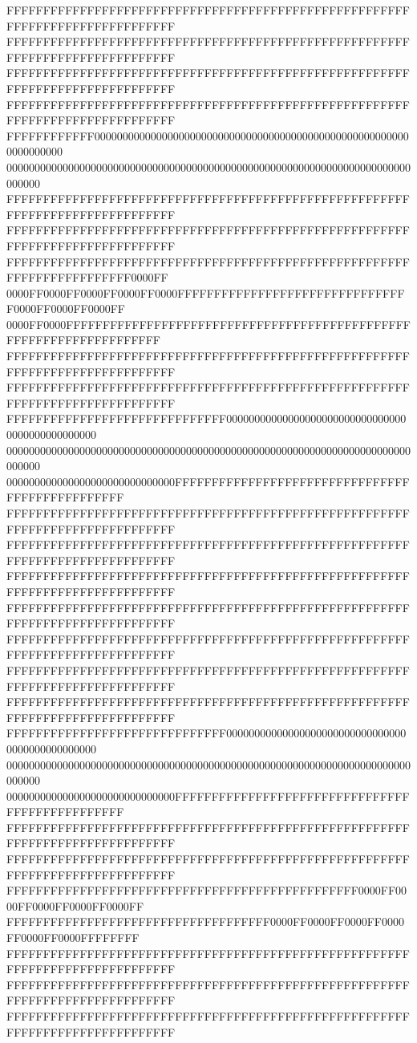 FFFFFFFFFFFFFFFFFFFFFFFFFFFFFFFFFFFFFFFFFFFFFFFFFFFFFFFFFFFFFFFFFFFFFFFFFFFFFF
FFFFFFFFFFFFFFFFFFFFFFFFFFFFFFFFFFFFFFFFFFFFFFFFFFFFFFFFFFFFFFFFFFFFFFFFFFFFFF
FFFFFFFFFFFFFFFFFFFFFFFFFFFFFFFFFFFFFFFFFFFFFFFFFFFFFFFFFFFFFFFFFFFFFFFFFFFFFF
FFFFFFFFFFFFFFFFFFFFFFFFFFFFFFFFFFFFFFFFFFFFFFFFFFFFFFFFFFFFFFFFFFFFFFFFFFFFFF
FFFFFFFFFFFF000000000000000000000000000000000000000000000000000000000000000000
000000000000000000000000000000000000000000000000000000000000000000000000000000
FFFFFFFFFFFFFFFFFFFFFFFFFFFFFFFFFFFFFFFFFFFFFFFFFFFFFFFFFFFFFFFFFFFFFFFFFFFFFF
FFFFFFFFFFFFFFFFFFFFFFFFFFFFFFFFFFFFFFFFFFFFFFFFFFFFFFFFFFFFFFFFFFFFFFFFFFFFFF
FFFFFFFFFFFFFFFFFFFFFFFFFFFFFFFFFFFFFFFFFFFFFFFFFFFFFFFFFFFFFFFFFFFFFFFF0000FF
0000FF0000FF0000FF0000FF0000FFFFFFFFFFFFFFFFFFFFFFFFFFFFFFFF0000FF0000FF0000FF
0000FF0000FFFFFFFFFFFFFFFFFFFFFFFFFFFFFFFFFFFFFFFFFFFFFFFFFFFFFFFFFFFFFFFFFFFF
FFFFFFFFFFFFFFFFFFFFFFFFFFFFFFFFFFFFFFFFFFFFFFFFFFFFFFFFFFFFFFFFFFFFFFFFFFFFFF
FFFFFFFFFFFFFFFFFFFFFFFFFFFFFFFFFFFFFFFFFFFFFFFFFFFFFFFFFFFFFFFFFFFFFFFFFFFFFF
FFFFFFFFFFFFFFFFFFFFFFFFFFFFFF000000000000000000000000000000000000000000000000
000000000000000000000000000000000000000000000000000000000000000000000000000000
000000000000000000000000000000FFFFFFFFFFFFFFFFFFFFFFFFFFFFFFFFFFFFFFFFFFFFFFFF
FFFFFFFFFFFFFFFFFFFFFFFFFFFFFFFFFFFFFFFFFFFFFFFFFFFFFFFFFFFFFFFFFFFFFFFFFFFFFF
FFFFFFFFFFFFFFFFFFFFFFFFFFFFFFFFFFFFFFFFFFFFFFFFFFFFFFFFFFFFFFFFFFFFFFFFFFFFFF
FFFFFFFFFFFFFFFFFFFFFFFFFFFFFFFFFFFFFFFFFFFFFFFFFFFFFFFFFFFFFFFFFFFFFFFFFFFFFF
FFFFFFFFFFFFFFFFFFFFFFFFFFFFFFFFFFFFFFFFFFFFFFFFFFFFFFFFFFFFFFFFFFFFFFFFFFFFFF
FFFFFFFFFFFFFFFFFFFFFFFFFFFFFFFFFFFFFFFFFFFFFFFFFFFFFFFFFFFFFFFFFFFFFFFFFFFFFF
FFFFFFFFFFFFFFFFFFFFFFFFFFFFFFFFFFFFFFFFFFFFFFFFFFFFFFFFFFFFFFFFFFFFFFFFFFFFFF
FFFFFFFFFFFFFFFFFFFFFFFFFFFFFFFFFFFFFFFFFFFFFFFFFFFFFFFFFFFFFFFFFFFFFFFFFFFFFF
FFFFFFFFFFFFFFFFFFFFFFFFFFFFFF000000000000000000000000000000000000000000000000
000000000000000000000000000000000000000000000000000000000000000000000000000000
000000000000000000000000000000FFFFFFFFFFFFFFFFFFFFFFFFFFFFFFFFFFFFFFFFFFFFFFFF
FFFFFFFFFFFFFFFFFFFFFFFFFFFFFFFFFFFFFFFFFFFFFFFFFFFFFFFFFFFFFFFFFFFFFFFFFFFFFF
FFFFFFFFFFFFFFFFFFFFFFFFFFFFFFFFFFFFFFFFFFFFFFFFFFFFFFFFFFFFFFFFFFFFFFFFFFFFFF
FFFFFFFFFFFFFFFFFFFFFFFFFFFFFFFFFFFFFFFFFFFFFFFF0000FF0000FF0000FF0000FF0000FF
FFFFFFFFFFFFFFFFFFFFFFFFFFFFFFFFFFFF0000FF0000FF0000FF0000FF0000FF0000FFFFFFFF
FFFFFFFFFFFFFFFFFFFFFFFFFFFFFFFFFFFFFFFFFFFFFFFFFFFFFFFFFFFFFFFFFFFFFFFFFFFFFF
FFFFFFFFFFFFFFFFFFFFFFFFFFFFFFFFFFFFFFFFFFFFFFFFFFFFFFFFFFFFFFFFFFFFFFFFFFFFFF
FFFFFFFFFFFFFFFFFFFFFFFFFFFFFFFFFFFFFFFFFFFFFFFFFFFFFFFFFFFFFFFFFFFFFFFFFFFFFF
